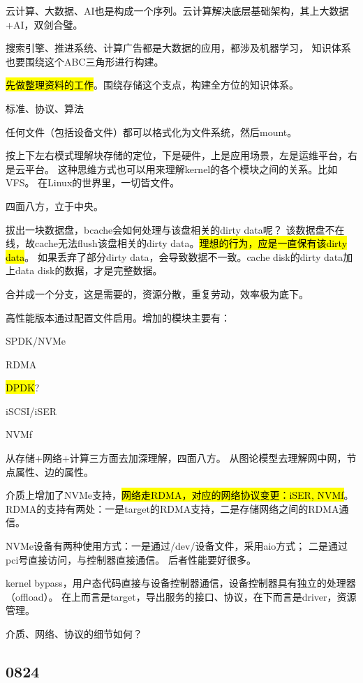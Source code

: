 云计算、大数据、AI也是构成一个序列。云计算解决底层基础架构，其上大数据+AI，双剑合璧。

搜索引擎、推进系统、计算广告都是大数据的应用，都涉及机器学习，
知识体系也要围绕这个ABC三角形进行构建。

\hl{先做整理资料的工作}。围绕存储这个支点，构建全方位的知识体系。

标准、协议、算法

任何文件（包括设备文件）都可以格式化为文件系统，然后mount。

按上下左右模式理解块存储的定位，下是硬件，上是应用场景，左是运维平台，右是云平台。
这种思维方式也可以用来理解kernel的各个模块之间的关系。比如VFS。
在Linux的世界里，一切皆文件。

四面八方，立于中央。

拔出一块数据盘，bcache会如何处理与该盘相关的dirty data呢？
该数据盘不在线，故cache无法flush该盘相关的dirty data。\hl{理想的行为，应是一直保有该dirty data}。
如果丢弃了部分dirty data，会导致数据不一致。cache disk的dirty data加上data disk的数据，才是完整数据。

合并成一个分支，这是需要的，资源分散，重复劳动，效率极为底下。

高性能版本通过配置文件启用。增加的模块主要有：
\begin{enumbox}
\item SPDK/NVMe
\item RDMA
\item \hl{DPDK}?
\item iSCSI/iSER
\item NVMf
\end{enumbox}

从存储+网络+计算三方面去加深理解，四面八方。
从图论模型去理解网中网，节点属性、边的属性。

介质上增加了NVMe支持，\hl{网络走RDMA，对应的网络协议变更：iSER, NVMf}。
RDMA的支持有两处：一是target的RDMA支持，二是存储网络之间的RDMA通信。

NVMe设备有两种使用方式：一是通过/dev/设备文件，采用aio方式； 二是通过pci号直接访问，与控制器直接通信。
后者性能要好很多。

kernel bypass，用户态代码直接与设备控制器通信，设备控制器具有独立的处理器（offload）。
在上而言是target，导出服务的接口、协议，在下而言是driver，资源管理。

介质、网络、协议的细节如何？

\subsection{0824}

